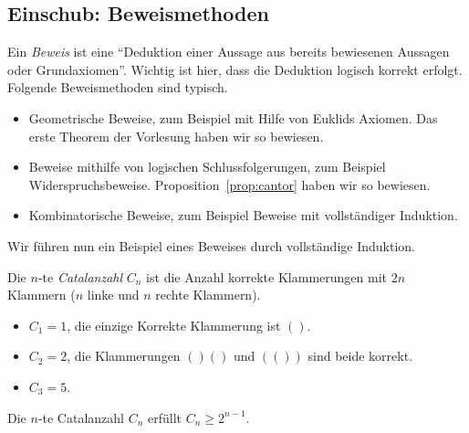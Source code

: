 \documentclass[../main.tex]{subfiles}
\begin{document}
\subsection*{Einschub: Beweismethoden}
Ein \emph{Beweis} ist eine ``Deduktion einer Aussage
aus bereits bewiesenen Aussagen oder Grundaxiomen''.
Wichtig ist hier, dass die Deduktion logisch korrekt erfolgt.
Folgende Beweismethoden sind typisch.
  \begin{itemize}
    \item Geometrische Beweise, zum Beispiel mit Hilfe von Euklids Axiomen.
      Das erste Theorem der Vorlesung haben wir so bewiesen.
    \item Beweise mithilfe von logischen Schlussfolgerungen,
      zum Beispiel Widerspruchsbeweise.
      Proposition~\ref{prop:cantor} haben wir so bewiesen.
    \item Kombinatorische Beweise, zum Beispiel
      Beweise mit vollständiger Induktion.
  \end{itemize}


Wir führen nun ein Beispiel eines Beweises durch vollständige Induktion.
\begin{definition}
  Die $n$-te \emph{Catalanzahl} $C_{n}$ ist die Anzahl korrekte
  Klammerungen mit $2n$ Klammern ($n$ linke und $n$ rechte Klammern).
\end{definition}

\begin{examples}
  \leavevmode
  \begin{itemize}
    \item
        $C_{1} = 1$, die einzige Korrekte Klammerung ist $()$.
    \item
      $C_{2} = 2$, die Klammerungen $()()$ und $(())$ sind beide korrekt.
    \item $C_{3} = 5$.
  \end{itemize}
\end{examples}

\begin{claim}
  Die $n$-te Catalanzahl $C_{n}$ erfüllt $C_{n} \geq 2^{n-1}$.
\end{claim}
\end{document}

